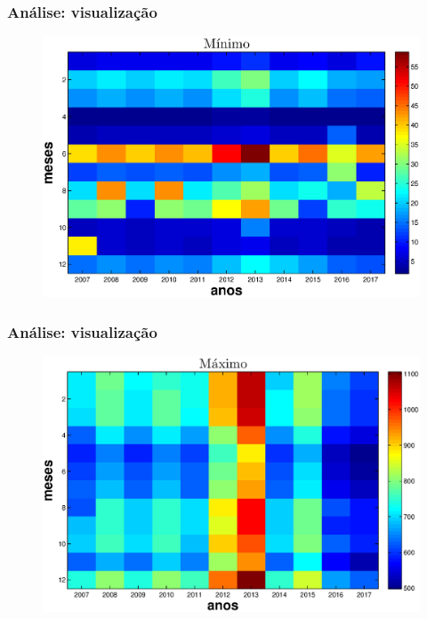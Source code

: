 \documentclass[xcolor=dvipsnames,xcolor=table]{beamer}
\begin{document}
\begin{frame}\frametitle{Análise: visualização}
\begin{figure}[htpb] \begin{center} 
\includegraphics[width=0.9\columnwidth]{min1}
\end{center}
\end{figure}
\end{frame}

\begin{frame}\frametitle{Análise: visualização}
\begin{figure}[htpb] \begin{center} 
\includegraphics[width=0.9\columnwidth]{max1}
\end{center}
\end{figure}
\end{frame}
\end{document}
